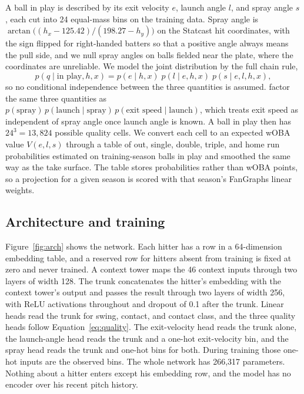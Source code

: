 \documentclass[11pt,letterpaper]{article}
\begin{document}
A ball in play is described by its exit velocity $e$, launch angle $l$, and spray angle $s$, each cut into 24 equal-mass bins on the training data. Spray angle is $\arctan\!\big((h_x - 125.42)/(198.27 - h_y)\big)$ on the Statcast hit coordinates, with the sign flipped for right-handed batters so that a positive angle always means the pull side, and we null spray angles on balls fielded near the plate, where the coordinates are unreliable. We model the joint distribution by the full chain rule,
\begin{equation}
p(q \mid \text{in play}, h, x) = p(e \mid h, x)\; p(l \mid e, h, x)\; p(s \mid e, l, h, x),
\label{eq:quality}
\end{equation}
so no conditional independence between the three quantities is assumed. \citet{melville2024} factor the same three quantities as $p(\text{spray})\,p(\text{launch} \mid \text{spray})\,p(\text{exit speed} \mid \text{launch})$, which treats exit speed as independent of spray angle once launch angle is known. A ball in play then has $24^3 = 13{,}824$ possible quality cells. We convert each cell to an expected wOBA value $V(e,l,s)$ through a table of out, single, double, triple, and home run probabilities estimated on training-season balls in play and smoothed the same way as the take surface. The table stores probabilities rather than wOBA points, so a projection for a given season is scored with that season's FanGraphs linear weights.

\subsection{Architecture and training}
\label{sec:arch}

Figure~\ref{fig:arch} shows the network. Each hitter has a row in a 64-dimension embedding table, and a reserved row for hitters absent from training is fixed at zero and never trained. A context tower maps the 46 context inputs through two layers of width 128. The trunk concatenates the hitter's embedding with the context tower's output and passes the result through two layers of width 256, with ReLU activations throughout and dropout of 0.1 after the trunk. Linear heads read the trunk for swing, contact, and contact class, and the three quality heads follow Equation~\ref{eq:quality}. The exit-velocity head reads the trunk alone, the launch-angle head reads the trunk and a one-hot exit-velocity bin, and the spray head reads the trunk and one-hot bins for both. During training those one-hot inputs are the observed bins. The whole network has 266,317 parameters. Nothing about a hitter enters except his embedding row, and the model has no encoder over his recent pitch history.
\end{document}
